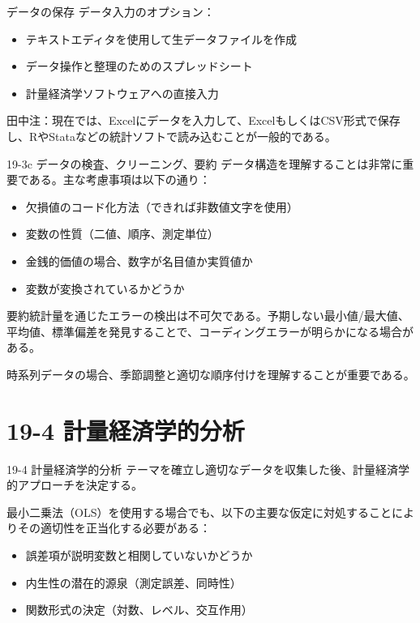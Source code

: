 \documentclass[
  ignorenonframetext,
]{beamer}
\providecommand{\tightlist}{%
  \setlength{\itemsep}{0pt}\setlength{\parskip}{0pt}}
\begin{document}
\begin{frame}{データの保存}
\label{ux30c7ux30fcux30bfux306eux4fddux5b58}
データ入力のオプション：

\begin{itemize}
\tightlist
\item
  テキストエディタを使用して生データファイルを作成
\item
  データ操作と整理のためのスプレッドシート
\item
  計量経済学ソフトウェアへの直接入力
\end{itemize}

田中注：現在では、Excelにデータを入力して、ExcelもしくはCSV形式で保存し、RやStataなどの統計ソフトで読み込むことが一般的である。
\end{frame}

\begin{frame}{19-3c データの検査、クリーニング、要約}
\label{c-ux30c7ux30fcux30bfux306eux691cux67fbux30afux30eaux30fcux30cbux30f3ux30b0ux8981ux7d04}
データ構造を理解することは非常に重要である。主な考慮事項は以下の通り：

\begin{itemize}
\tightlist
\item
  欠損値のコード化方法（できれば非数値文字を使用）
\item
  変数の性質（二値、順序、測定単位）
\item
  金銭的価値の場合、数字が名目値か実質値か
\item
  変数が変換されているかどうか
\end{itemize}

要約統計量を通じたエラーの検出は不可欠である。予期しない最小値/最大値、平均値、標準偏差を発見することで、コーディングエラーが明らかになる場合がある。

時系列データの場合、季節調整と適切な順序付けを理解することが重要である。
\end{frame}

\section{19-4
計量経済学的分析}\label{ux8a08ux91cfux7d4cux6e08ux5b66ux7684ux5206ux6790}

\begin{frame}{19-4 計量経済学的分析}
\label{ux8a08ux91cfux7d4cux6e08ux5b66ux7684ux5206ux6790-1}
テーマを確立し適切なデータを収集した後、計量経済学的アプローチを決定する。

最小二乗法（OLS）を使用する場合でも、以下の主要な仮定に対処することによりその適切性を正当化する必要がある：

\begin{itemize}
\tightlist
\item
  誤差項が説明変数と相関していないかどうか
\item
  内生性の潜在的源泉（測定誤差、同時性）
\item
  関数形式の決定（対数、レベル、交互作用）
\end{itemize}
\end{frame}
\end{document}
